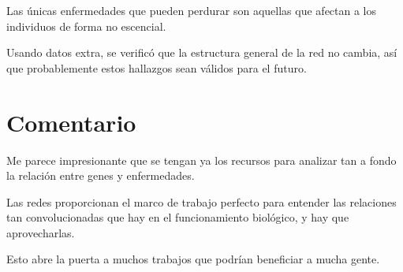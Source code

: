 \documentclass[12pt, letterpaper]{article}
\begin{document}
    Las únicas enfermedades que pueden perdurar son aquellas que afectan a los 
    individuos de forma no escencial.

    Usando datos extra, se verificó que la estructura general de la red no 
    cambia, así que probablemente estos hallazgos sean válidos para el futuro.

    \section*{Comentario}

    Me parece impresionante que se tengan ya los recursos para analizar tan a 
    fondo la relación entre genes y enfermedades.

    Las redes proporcionan el marco de trabajo perfecto para entender las 
    relaciones tan convolucionadas que hay en el funcionamiento biológico, y hay
    que aprovecharlas.

    Esto abre la puerta a muchos trabajos que podrían beneficiar a mucha gente.
\end{document}
